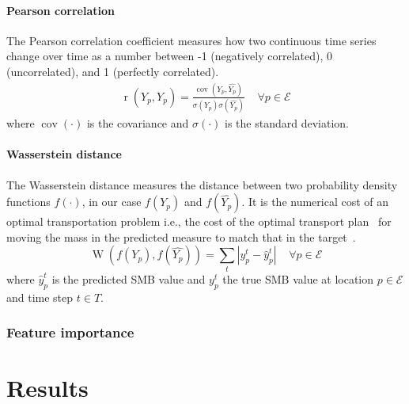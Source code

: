 \documentclass[a4paper,11pt,oneside]{report}
\begin{document}
\subsubsection{Pearson correlation}\label{subsubsec:pearson-corr}
The Pearson correlation coefficient measures how two continuous time series change over time as a number between -1 (negatively correlated), 0 (uncorrelated), and 1 (perfectly correlated).
\begin{align}
    \operatorname{r}\left(Y_{p},\widehat{Y_{p}}\right) = \frac{\operatorname{cov}(Y_{p},\widehat{Y_{p}})}{\sigma(Y_{p})\sigma(\widehat{Y_{p}})} \;\;\;\; \forall p \in \mathcal{E} 
\end{align}
where $\operatorname {cov}(\cdot)$  is the covariance and  $\sigma(\cdot)$ is the standard deviation.

\subsubsection{Wasserstein distance}\label{subsubsec:wasserstein}
The Wasserstein distance measures the distance between two probability density functions $f(\cdotp)$, in our case $f(Y_p)$ and $f(\widehat{Y_p})$. It is the numerical cost of an optimal transportation problem i.e., the cost of the optimal transport plan~\cite{villani} for moving the mass in the predicted
measure to match that in the target~\cite{wasserstein1}. 
\begin{equation}
    \operatorname{W}\left(f(Y_p),f(\widehat{Y_p})\right) = \sum_{t}|y^{t}_{p}-\hat{y}_{p}^{t}| \;\;\;\; \forall p \in \mathcal{E}
\end{equation}
where $\hat{y}_{p}^{t}$ is the predicted SMB value and $y^{t}_{p}$ the true SMB value at location $p\in \mathcal{E} $ and time step $t\in T$. 

\subsection{Feature importance}


\chapter{Results}
\end{document}
